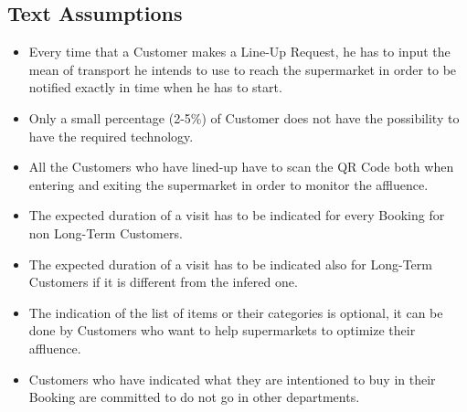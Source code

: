 \subsection{Text Assumptions}

\begin{itemize}
	\item Every time that a Customer makes a Line-Up Request, he has to input the mean of transport he intends to use to reach the supermarket in order to be notified exactly in time when he has to start.
	\item Only a small percentage (2-5\%) of Customer does not have the possibility to have the required technology.
	\item All the Customers who have lined-up have to scan the QR Code both when entering and exiting the supermarket in order to monitor the affluence.
	\item The expected duration of a visit has to be indicated for every Booking for non Long-Term Customers.
	\item The expected duration of a visit has to be indicated also for Long-Term Customers if it is different from the infered one.
	\item The indication of the list of items or their categories is optional, it can be done by Customers who want to help supermarkets to optimize their affluence.
	\item Customers who have indicated what they are intentioned to buy in their Booking are committed to do not go in other departments. 
\end{itemize}